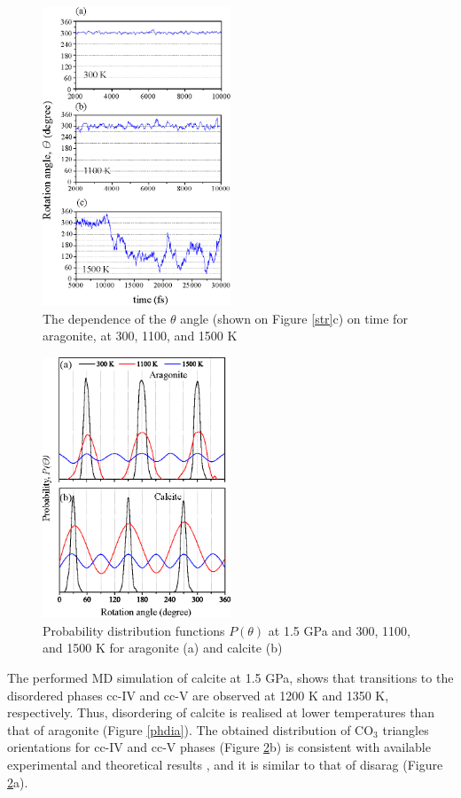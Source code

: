 \documentclass[journal=jacsat,manuscript=article]{achemso}
\begin{document}
\begin{figure}[H]
\includegraphics[width=0.5\textwidth]{rot15} \centering
\caption{The dependence of the $\theta$ angle (shown on Figure \ref{str}c) on time for aragonite, at 300, 1100, and 1500 K} \label{rot15}
\end{figure}

\begin{figure}[H]
\includegraphics[width=0.5\textwidth]{distr15} \centering
\caption{Probability distribution functions $P(\theta)$ at 1.5 GPa and 300, 1100, and 1500 K for aragonite (a) and calcite (b)} \label{distr15}
\end{figure}

The performed MD simulation of calcite at 1.5 GPa, shows that transitions to the disordered phases cc-IV and cc-V are observed at 1200 K and 1350 K, respectively.
Thus, disordering  of calcite is realised at lower temperatures than that of aragonite (Figure \ref{phdia}). 
The obtained distribution of CO$_3$ triangles orientations for cc-IV and cc-V phases (Figure \ref{distr15}b) is consistent with available experimental \cite{ishizawa2013} and theoretical results \cite{kawano2009}, and it is similar to that of disarag (Figure \ref{distr15}a).
\end{document}
